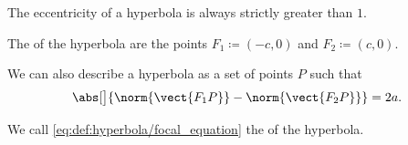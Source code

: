 \begin{definition}
\begin{thmenum}
    The eccentricity of a hyperbola is always strictly greater than \( 1 \).

     The  of the hyperbola are the points \( F_1 \coloneqq (-c, 0) \) and \( F_2 \coloneqq (c, 0) \).

     We can also describe a hyperbola as a set of points \( P \) such that
    \begin{equation}\label{eq:def:hyperbola/focal_equation}
      \abs[\big]{ \norm{\vect{F_1 P}} - \norm{\vect{F_2 P}} } = 2a.
    \end{equation}

    We call \eqref{eq:def:hyperbola/focal_equation} the  of the hyperbola.
  \end{thmenum}
\end{definition}
